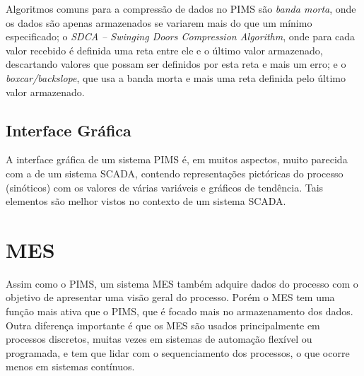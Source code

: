 Algoritmos comuns para a compressão de dados no PIMS são \emph{banda morta}, onde os dados são apenas armazenados se variarem mais do que um mínimo especificado; o \emph{SDCA -- Swinging Doors Compression Algorithm}, onde para cada valor recebido é definida uma reta entre ele e o último valor armazenado, descartando valores que possam ser definidos por esta reta e mais um erro; e o \emph{boxcar/backslope}, que usa a banda morta e mais uma reta definida pelo último valor armazenado. %

\subsection{Interface Gráfica}
A interface gráfica de um sistema PIMS é, em muitos aspectos, muito parecida com a de um sistema SCADA, contendo representações pictóricas do processo (sinóticos) com os valores de várias variáveis e gráficos de tendência. Tais elementos são melhor vistos no contexto de um sistema SCADA.

\section{MES}
Assim como o PIMS, um sistema MES também adquire dados do processo com o objetivo de apresentar uma visão geral do processo. Porém o MES tem uma função mais ativa que o PIMS, que é focado mais no armazenamento dos dados. Outra diferença importante é que os MES são usados principalmente em processos discretos, muitas vezes em sistemas de automação flexível ou programada, e tem que lidar com o sequenciamento dos processos, o que ocorre menos em sistemas contínuos.

